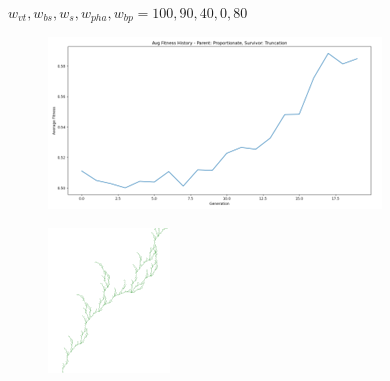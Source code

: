 \begin{figure}[H]
\begin{subfigure}[b]{0.1\textwidth}
    \end{subfigure}

    \vspace{0.5cm}
    \caption{$w_{vt}, w_{bs}, w_{s}, w_{pha}, w_{bp} = 100, 90, 40, 0, 80$}
    \label{fig:mutation_comparison}
\end{figure}

\begin{figure}[H]
    \centering
    \begin{subfigure}[b]{0.3\textwidth}
        \includegraphics[width=\textwidth]{image1.png}
    \end{subfigure}
    \begin{subfigure}[b]{0.1\textwidth}
        \includegraphics[width=\textwidth]{image.png}
    \end{subfigure}


\end{figure}
